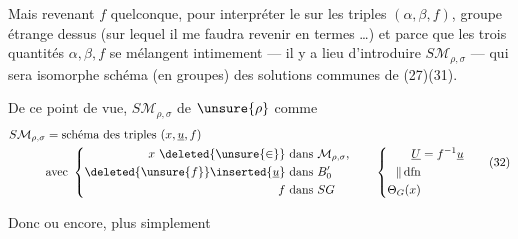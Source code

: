 Mais revenant  $f$ quelconque, pour interpréter le   sur les triples $(\alpha,\beta,f)$,   groupe étrange dessus  (sur lequel il me faudra revenir en termes  \ldots) et parce que les trois quantités $\alpha,\beta,f$ se mélangent intimement --- il y a lieu d'introduire $S\mathcal M_{\rho,\sigma}$ --- qui sera isomorphe  schéma (en groupes) des solutions communes de (27)(31).

De ce point de vue, $S\mathcal M_{\rho,\sigma}$  de $\unsure{\rho}$ comme  
\[
\begin{aligned}
S\mathcal M_{\rho,\sigma}&=\text{schéma des triples }(x,\underline u,f)\\
&\text{avec }\left\{
\begin{aligned}
x\ \deleted{\unsure{\in}}&\text{ dans }\mathcal M_{\rho,\sigma},\\
\deleted{\unsure{f}}\inserted{\underline u}&\text{ dans }B'_0\\
f&\text{ dans }SG
\end{aligned}
\right.
\qquad\left\{
\begin{aligned}
\underline U&=f^{-1}\underline u\\
\Vert\,\mathrm{dfn}&\\
\Theta_G(x)&
\end{aligned}\right.
\end{aligned}\tag{32}
\]

Donc
ou encore, plus simplement

